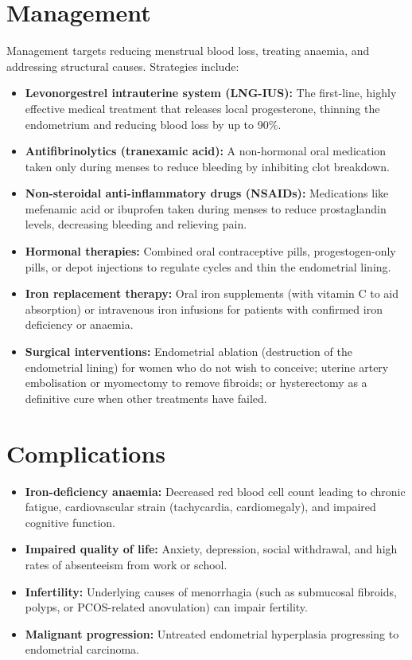 \section*{Management}
Management targets reducing menstrual blood loss, treating anaemia, and addressing structural causes. Strategies include:
\begin{itemize}
    \item \textbf{Levonorgestrel intrauterine system (LNG-IUS):} The first-line, highly effective medical treatment that releases local progesterone, thinning the endometrium and reducing blood loss by up to 90\%.
    \item \textbf{Antifibrinolytics (tranexamic acid):} A non-hormonal oral medication taken only during menses to reduce bleeding by inhibiting clot breakdown.
    \item \textbf{Non-steroidal anti-inflammatory drugs (NSAIDs):} Medications like mefenamic acid or ibuprofen taken during menses to reduce prostaglandin levels, decreasing bleeding and relieving pain.
    \item \textbf{Hormonal therapies:} Combined oral contraceptive pills, progestogen-only pills, or depot injections to regulate cycles and thin the endometrial lining.
    \item \textbf{Iron replacement therapy:} Oral iron supplements (with vitamin C to aid absorption) or intravenous iron infusions for patients with confirmed iron deficiency or anaemia.
    \item \textbf{Surgical interventions:} Endometrial ablation (destruction of the endometrial lining) for women who do not wish to conceive; uterine artery embolisation or myomectomy to remove fibroids; or hysterectomy as a definitive cure when other treatments have failed.
\end{itemize}

\section*{Complications}
\begin{itemize}
    \item \textbf{Iron-deficiency anaemia:} Decreased red blood cell count leading to chronic fatigue, cardiovascular strain (tachycardia, cardiomegaly), and impaired cognitive function.
    \item \textbf{Impaired quality of life:} Anxiety, depression, social withdrawal, and high rates of absenteeism from work or school.
    \item \textbf{Infertility:} Underlying causes of menorrhagia (such as submucosal fibroids, polyps, or PCOS-related anovulation) can impair fertility.
    \item \textbf{Malignant progression:} Untreated endometrial hyperplasia progressing to endometrial carcinoma.
\end{itemize}

